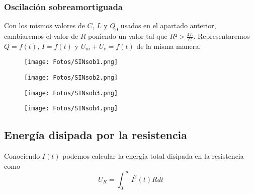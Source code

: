 \documentclass{article}
\begin{document}
\clearpage

        \subsubsection{Oscilación sobreamortiguada} 
        Con los mismos valores de $C$, $L$ y $Q_0$ usados en el apartado anterior, cambiaremos el valor de $R$ poniendo un valor tal que $R²>\frac{4L}{C}$. Representaremos $Q=f(t)$, $I=f(t)$ y $U_m+U_e=f(t)$ de la misma manera.
        
        \vspace{1.5cm}
        \begin{figure}[h]
            \centering
            \begin{minipage}{.5\textwidth}
                \centering
                \texttt{[image: Fotos/SINsob1.png]}
            \end{minipage}%
            \begin{minipage}{.5\textwidth}
                \centering
                \texttt{[image: Fotos/SINsob2.png]}
            \end{minipage}
        \end{figure}
    
        \vspace{0.4cm}
        \begin{figure}[h]
            \centering
            \begin{minipage}{.5\textwidth}
                \centering
                \texttt{[image: Fotos/SINsob3.png]}
            \end{minipage}%
            \begin{minipage}{.5\textwidth}
                \centering
                \texttt{[image: Fotos/SINsob4.png]}
            \end{minipage}
        \end{figure}
        
\clearpage

    \subsection{Energía disipada por la resistencia}
        Conociendo $I(t)$ podemos calcular la energía total disipada en la resistencia como $$U_R=\int_0^\infty I^2(t)Rdt$$ 
    
\end{document}
